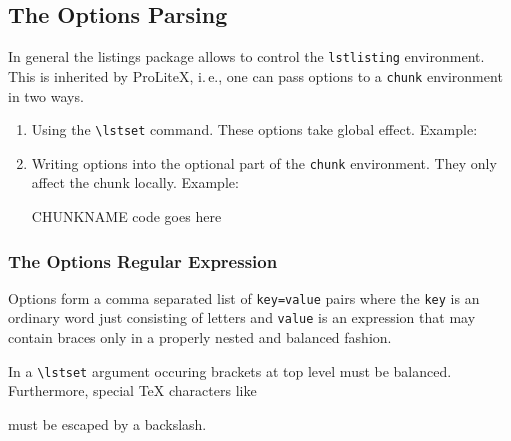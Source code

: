 \documentclass[a4paper]{article} %
\newcommand{\packagename}[1]{{\normalfont\sffamily#1}}
\newcommand\ProLiteX{\textsf{ProLiteX}}
\newcommand{\ie}{i.\,e.}
\begin{document}
\subsection{The Options Parsing}\label{sec:parsing}
In general the \packagename{listings} package allows to control the
\texttt{lstlisting} environment. This is inherited by \ProLiteX{},
\ie, one can pass options to a \texttt{chunk} environment in two ways.
\begin{enumerate}
\item Using the \verb'\lstset' command. These options take global
  effect. Example:
\begin{myverbatim}
\end{myverbatim}
\item Writing options into the optional part of the \texttt{chunk}
  environment. They only affect the chunk locally. Example:
\begin{myverbatim}
  \begin{chunk}[chunkref={<'}{'>},gobble=2]{CHUNKNAME}
    code goes here
  \end{chunk}
\end{myverbatim}
\end{enumerate}


\subsubsection{The Options Regular Expression}
Options form a comma separated list of \texttt{key=value} pairs where
the \texttt{key} is an ordinary word just consisting of letters and
\texttt{value} is an expression that may contain braces only in a
properly nested and balanced fashion.

In a \verb'\lstset' argument occuring brackets at top level
must be balanced. Furthermore, special \TeX{} characters like
\begin{myverbatim}
  \ { } $ & # ^ _ %
\end{myverbatim}
must be escaped by a backslash.
\end{document}
